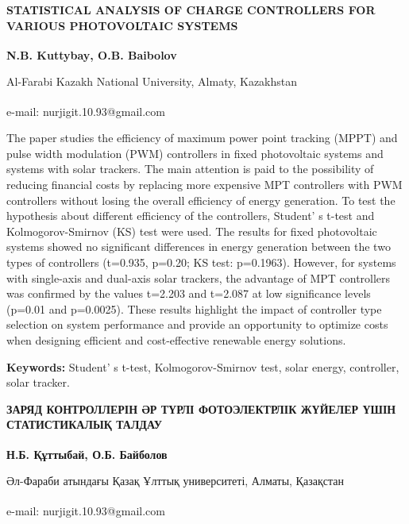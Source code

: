 \begin{articleheader}
{\bfseries STATISTICAL ANALYSIS OF CHARGE CONTROLLERS FOR VARIOUS
PHOTOVOLTAIC SYSTEMS}

{\bfseries
N.B. Kuttybay\textsuperscript{\envelope },
O.B. Baibolov
}
\end{articleheader}

\begin{affiliation}
Al-Farabi Kazakh National University, Almaty, Kazakhstan

\textsuperscript{\envelope }e-mail: nurjigit.10.93@gmail.com
\end{affiliation}

The paper studies the efficiency of maximum power point tracking (MPPT)
and pulse width modulation (PWM) controllers in fixed photovoltaic
systems and systems with solar trackers. The main attention is paid to
the possibility of reducing financial costs by replacing more expensive
MPT controllers with PWM controllers without losing the overall
efficiency of energy generation. To test the hypothesis about different
efficiency of the controllers, Student' s t-test and
Kolmogorov-Smirnov (KS) test were used. The results for fixed
photovoltaic systems showed no significant differences in energy
generation between the two types of controllers (t=0.935, p=0.20; KS
test: p=0.1963). However, for systems with single-axis and dual-axis
solar trackers, the advantage of MPT controllers was confirmed by the
values \hspace{0pt}\hspace{0pt}t=2.203 and t=2.087 at low significance
levels (p=0.01 and p=0.0025). These results highlight the impact of
controller type selection on system performance and provide an
opportunity to optimize costs when designing efficient and
cost-effective renewable energy solutions.

{\bfseries Keywords:} Student' s t-test, Kolmogorov-Smirnov
test, solar energy, controller, solar tracker.

\begin{articleheader}
{\bfseries ЗАРЯД КОНТРОЛЛЕРІН ӘР ТҮРЛІ ФОТОЭЛЕКТРЛІК ЖҮЙЕЛЕР ҮШІН
СТАТИСТИКАЛЫҚ ТАЛДАУ}

{\bfseries
Н.Б. Құттыбай\textsuperscript{\envelope },
О.Б. Байболов}
\end{articleheader}

\begin{affiliation}
Әл-Фараби атындағы Қазақ Ұлттық университеті, Алматы, Қазақстан

\textsuperscript{\envelope }e-mail: nurjigit.10.93@gmail.com
\end{affiliation}

